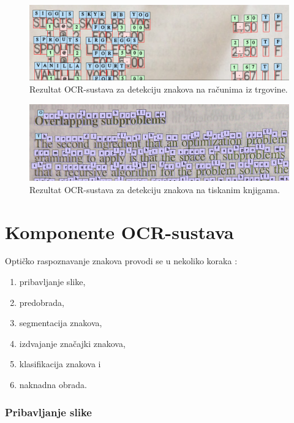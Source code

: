 \documentclass[times, utf8, zavrsni]{fer}
\begin{document}
\begin{figure}[htb]
    \centering
    \includegraphics[width=\textwidth]{images/receipt-example-01.png}
    \caption{Rezultat OCR-sustava za detekciju znakova na računima iz trgovine.}
    \label{fig:receipt-example-01}
\end{figure}

\begin{figure}[htb]
    \centering
    \includegraphics[width=\textwidth]{images/book-example-01.png}
    \caption{Rezultat OCR-sustava za detekciju znakova na tiskanim knjigama.}
    \label{fig:book-example-01}
\end{figure}

\pagebreak

\section{Komponente OCR-sustava}
\label{sec:komponente-ocr-sustava}
Optičko raspoznavanje znakova provodi se u nekoliko koraka \citep{DBLP:journals/corr/abs-1710-05703} \citep{kaur2016survey}:
\begin{enumerate}
    \item pribavljanje slike,
    \item predobrada,
    \item segmentacija znakova,
    \item izdvajanje značajki znakova,
    \item klasifikacija znakova i
    \item naknadna obrada.
\end{enumerate}

\subsubsection{Pribavljanje slike}
\end{document}
